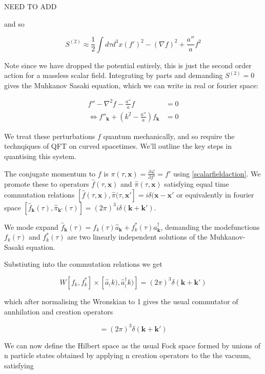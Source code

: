 \documentclass[a4paper,11pt]{article}
\renewcommand{\v}[1]{\mathbf{#1}}
\newcommand{\half}{\frac{1}{2}}
\newcommand{\ann}[1]{\hat{a}_{\v{#1}}}
\newcommand{\cre}[1]{\hat{a}^\dagger_{\v{#1}}}
\begin{document}
NEED TO ADD

and so 

\begin{equation}
S^{(2)} \approx \half \int d\tau d^3x (f')^2 - (\nabla f)^2 + \frac{a''}{a}f^2
\end{equation}

Note since we have dropped the potential entirely, this is just the second order action for a massless scalar field. Integrating by parts and demanding $S^{(2)}=0$ gives the Muhkanov Sasaki equation, which we can write in real or fourier space:

\begin{align}
f''-\nabla^2f-\frac{a''}{a}f &= 0 \\
\Leftrightarrow f''_{\v{k}} + (k^2-\frac{a''}{a})f_{\v{k}} &= 0
\label{MS}
\end{align}

We treat these perturbations $f$ quantum mechanically, and so require the technqiques of QFT on curved spacetimes. We'll outline the key steps in quantising this system.

The conjugate momentum to $f$ is $\pi(\tau, \v{x}) =  \frac{\partial \mathcal{L}}{\partial f'} = f'$ using \ref{scalarfieldaction}. We promote these to operators $\hat{f}(\tau, \v{x})$ and $\hat{\pi}(\tau, \v{x})$ satisfying equal time commutation relations $[\hat{f}(\tau, \v{x}), \hat{\pi}(\tau, \v{x'}] = i\delta(\v{x}-\v{x'}$ or equivalently in fourier space $[\hat{f}_{\v{k}}(\tau), \hat{\pi}_{\v{k'}}(\tau)] = (2\pi)^3i\delta(\v{k}+\v{k'})$.

We mode expand $\hat{f}_{\v{k}}(\tau) = f_k(\tau)\ann{k}+f_k^*(\tau)\cre{k}$, demanding the modefunctions $f_k(\tau)$ and $f_k^*(\tau)$ are two linearly independent solutions of the Muhkanov-Sasaki equation. 

Substiuting into the commutation relations we get 

\begin{equation}
W[f_k,f_k^*]\times[\ann(k), \cre(k)] = (2\pi)^3\delta(\v{k}+\v{k'})
\end{equation}

which after normalising the Wronskian to 1 gives the usual commutator of annhilation and creation operators

\begin{equation}
[\ann{k}, \cre{k}] = (2\pi)^3\delta(\v{k}+\v{k'})
\end{equation}

We can now define the Hilbert space as the usual Fock space formed by unions of n particle states obtained by applying n creation operators to the the vacuum, satisfying 
\end{document}
